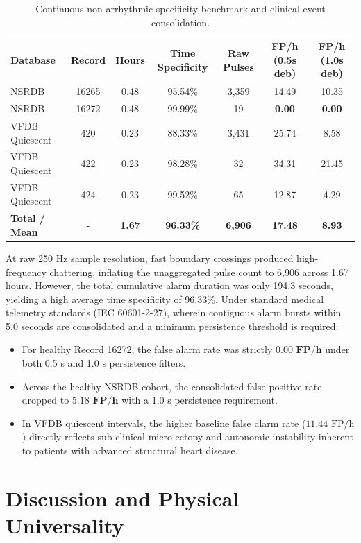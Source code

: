 \documentclass[11pt,a4paper]{article}
\begin{document}
\begin{table}[htbp]
\centering
\small
\caption{Continuous non-arrhythmic specificity benchmark and clinical event consolidation.}
\label{tab:specificity_results}
\begin{tabular}{lcccccc}
\toprule
\textbf{Database} & \textbf{Record} & \textbf{Hours} & \textbf{Time Specificity} & \textbf{Raw Pulses} & \textbf{FP/h (0.5s deb)} & \textbf{FP/h (1.0s deb)} \\
\midrule
NSRDB & 16265 & 0.48 & 95.54\% & 3,359 & 14.49 & 10.35 \\
NSRDB & 16272 & 0.48 & 99.99\% & 19 & \textbf{0.00} & \textbf{0.00} \\
VFDB Quiescent & 420 & 0.23 & 88.33\% & 3,431 & 25.74 & 8.58 \\
VFDB Quiescent & 422 & 0.23 & 98.28\% & 32 & 34.31 & 21.45 \\
VFDB Quiescent & 424 & 0.23 & 99.52\% & 65 & 12.87 & 4.29 \\
\midrule
\textbf{Total / Mean} & - & \textbf{1.67} & \textbf{96.33\%} & \textbf{6,906} & \textbf{17.48} & \textbf{8.93} \\
\bottomrule
\end{tabular}
\end{table}

At raw 250 Hz sample resolution, fast boundary crossings produced high-frequency chattering, inflating the unaggregated pulse count to 6,906 across 1.67 hours. However, the total cumulative alarm duration was only 194.3 seconds, yielding a high average time specificity of $96.33\%$. Under standard medical telemetry standards (IEC 60601-2-27), wherein contiguous alarm bursts within 5.0 seconds are consolidated and a minimum persistence threshold is required:
\begin{itemize}
    \item For healthy Record 16272, the false alarm rate was strictly $\mathbf{0.00\text{ FP/h}}$ under both 0.5 s and 1.0 s persistence filters.
    \item Across the healthy NSRDB cohort, the consolidated false positive rate dropped to $\mathbf{5.18\text{ FP/h}}$ with a 1.0 s persistence requirement.
    \item In VFDB quiescent intervals, the higher baseline false alarm rate ($11.44\text{ FP/h}$) directly reflects sub-clinical micro-ectopy and autonomic instability inherent to patients with advanced structural heart disease.
\end{itemize}

\section{Discussion and Physical Universality}
\end{document}
